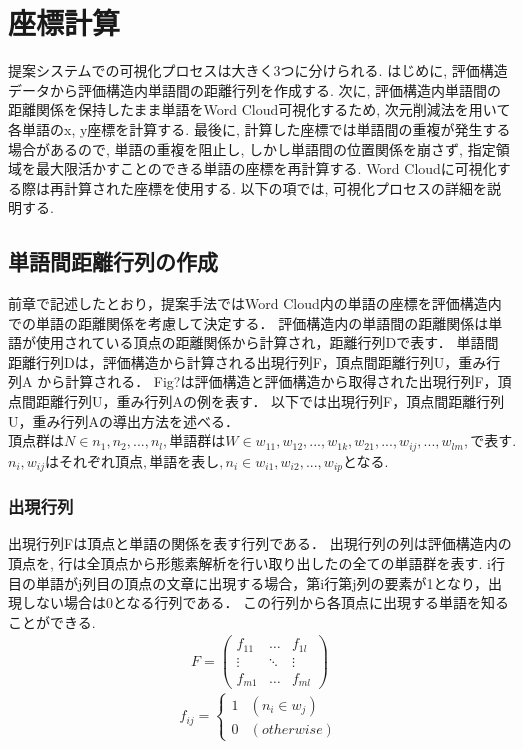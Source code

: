 \documentclass[syuuron]{kuee}
\begin{document}
	\section{座標計算}
		提案システムでの可視化プロセスは大きく3つに分けられる. 
		はじめに, 評価構造データから評価構造内単語間の距離行列を作成する. 
		次に, 評価構造内単語間の距離関係を保持したまま単語をWord Cloud可視化するため, 次元削減法を用いて各単語のx, y座標を計算する. 
		最後に, 計算した座標では単語間の重複が発生する場合があるので, 
		単語の重複を阻止し, しかし単語間の位置関係を崩さず, 指定領域を最大限活かすことのできる単語の座標を再計算する. 
		Word Cloudに可視化する際は再計算された座標を使用する. 
		以下の項では, 可視化プロセスの詳細を説明する. 
		
		\subsection{単語間距離行列の作成}
			前章で記述したとおり，提案手法ではWord Cloud内の単語の座標を評価構造内での単語の距離関係を考慮して決定する．
			評価構造内の単語間の距離関係は単語が使用されている頂点の距離関係から計算され，距離行列Dで表す．
			単語間距離行列Dは，評価構造から計算される出現行列F，頂点間距離行列U，重み行列A から計算される．
			Fig?は評価構造と評価構造から取得された出現行列F，頂点間距離行列U，重み行列Aの例を表す．
			以下では出現行列F，頂点間距離行列U，重み行列Aの導出方法を述べる．
			$頂点群はN \in {n_{1}, n_{2}, ..., n_{l}}, 単語群はW \in {w_{11}, w_{12}, ..., w_{1k}, w_{21},..., w_{ij},..., w_{lm}}, で表す. $
			$n_i,w_{ij}はそれぞれ頂点, 単語を表し, n_i \in {w_{i1}, w_{i2}, ..., w_{ip}}$となる. 
		
			\subsubsection{出現行列}
				出現行列Fは頂点と単語の関係を表す行列である．
				出現行列の列は評価構造内の頂点を, 行は全頂点から形態素解析を行い取り出したの全ての単語群を表す. 
				i行目の単語がj列目の頂点の文章に出現する場合，第i行第j列の要素が1となり，出現しない場合は0となる行列である．
				この行列から各頂点に出現する単語を知ることができる. 
				\begin{eqnarray}
				 F = \left(
				    \begin{array}{cccc}
				    	f_{11} & \ldots & f_{1l} \\
				    	\vdots & \ddots & \vdots \\
				    	f_{m1} & \ldots & f_{ml}
					\end{array}
				 \right)
				\end{eqnarray}	
				\[
				  f_{ij} = \left\{ \begin{array}{ll}
				    1 & (n_i \in w_j) \\
				    0 & (otherwise)
				  \end{array} \right.
				\]
				
\end{document}
